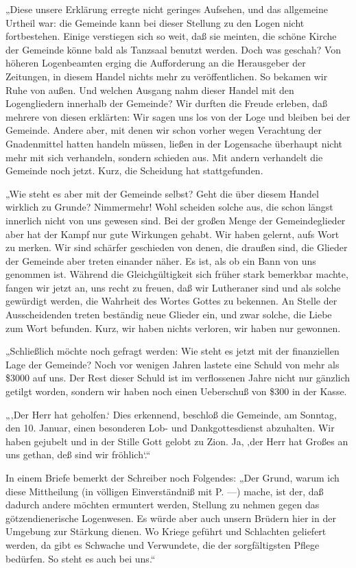 „Diese unsere Erklärung erregte nicht geringes Aufsehen, und das allgemeine Urtheil war: die Gemeinde kann bei dieser Stellung zu den Logen nicht fortbestehen. Einige verstiegen sich so weit, daß sie meinten, die schöne Kirche der Gemeinde könne bald als Tanzsaal benutzt werden. Doch was geschah? Von höheren Logenbeamten erging die Aufforderung an die Herausgeber der Zeitungen, in diesem Handel nichts mehr zu veröffentlichen. So bekamen wir Ruhe von außen. Und welchen Ausgang nahm dieser Handel mit den Logengliedern innerhalb der Gemeinde? Wir durften die Freude erleben, daß mehrere von diesen erklärten: Wir sagen uns los von der Loge und bleiben bei der Gemeinde. Andere aber, mit denen wir schon vorher wegen Verachtung der Gnadenmittel hatten handeln müssen, ließen in der Logensache überhaupt nicht mehr mit sich verhandeln, sondern schieden aus. Mit andern verhandelt die Gemeinde noch jetzt. Kurz, die Scheidung hat stattgefunden.

„Wie steht es aber mit der Gemeinde selbst? Geht die über diesem Handel wirklich zu Grunde? Nimmermehr! Wohl scheiden solche aus, die schon längst innerlich nicht von uns gewesen sind. Bei der großen Menge der Gemeindeglieder aber hat der Kampf nur gute Wirkungen gehabt. Wir haben gelernt, aufs Wort zu merken. Wir sind schärfer geschieden von denen, die draußen sind, die Glieder der Gemeinde aber treten einander näher. Es ist, als ob ein Bann von uns genommen ist. Während die Gleichgültigkeit sich früher stark bemerkbar machte, fangen wir jetzt an, uns recht zu freuen, daß wir Lutheraner sind und als solche gewürdigt werden, die Wahrheit des Wortes Gottes zu bekennen. An Stelle der Ausscheidenden treten beständig neue Glieder ein, und zwar solche, die Liebe zum Wort befunden. Kurz, wir haben nichts verloren, wir haben nur gewonnen.

„Schließlich möchte noch gefragt werden: Wie steht es jetzt mit der finanziellen Lage der Gemeinde? Noch vor wenigen Jahren lastete eine Schuld von mehr als \$3000 auf uns. Der Rest dieser Schuld ist im verflossenen Jahre nicht nur gänzlich getilgt worden, sondern wir haben noch einen Ueberschuß von \$300 in der Kasse.

„‚Der Herr hat geholfen.‘ Dies erkennend, beschloß die Gemeinde, am Sonntag, den 10. Januar, einen besonderen Lob- und Dankgottesdienst abzuhalten. Wir haben gejubelt und in der Stille Gott gelobt zu Zion. Ja, ‚der Herr hat Großes an uns gethan, deß sind wir fröhlich‘.“

In einem Briefe bemerkt der Schreiber noch Folgendes: „Der Grund, warum ich diese Mittheilung (in völligen Einverständniß mit P. —) mache, ist der, daß dadurch andere möchten
ermuntert werden, Stellung zu nehmen gegen das götzendienerische Logenwesen. Es würde aber auch unsern Brüdern hier in der Umgebung zur Stärkung dienen. Wo Kriege geführt und Schlachten geliefert werden, da gibt es Schwache und Verwundete, die der sorgfältigsten Pflege bedürfen. So steht es auch bei uns.“

